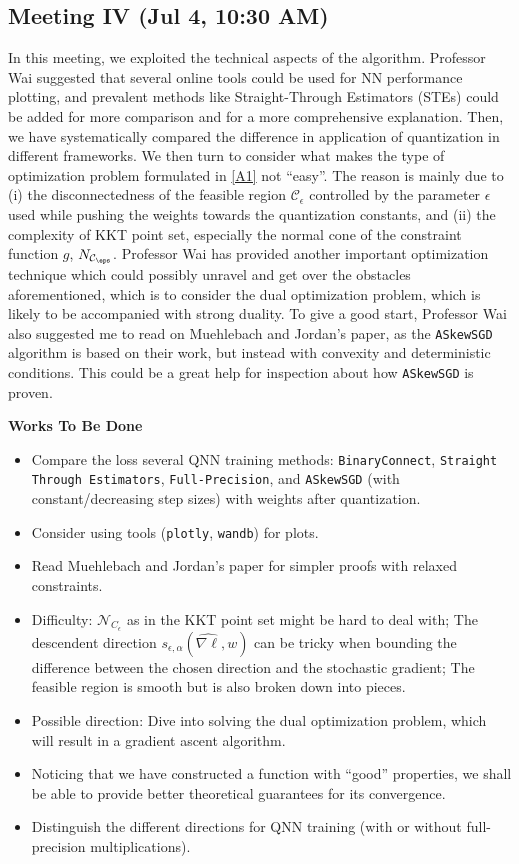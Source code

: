 \documentclass[10pt,a4paper]{article}
\begin{document}
\subsection{Meeting IV (Jul 4, 10:30 AM)}

In this meeting, we exploited the technical aspects of the algorithm. Professor Wai suggested that several online tools could be used for NN performance plotting, and prevalent methods like Straight-Through Estimators (STEs) could be added for more comparison and for a more comprehensive explanation. Then, we have systematically compared the difference in application of quantization in different frameworks. We then turn to consider what makes the type of optimization problem formulated in \ref{A1} not ``easy''. The reason is mainly due to (i) the disconnectedness of the feasible region $\mathcal{C}_{\epsilon}$ controlled by the parameter $\epsilon$ used while pushing the weights towards the quantization constants, and (ii) the complexity of KKT point set, especially the normal cone of the constraint function $g$, $N_{\mathcal{C}_{\eps}}$. Professor Wai has provided another important optimization technique which could possibly unravel and get over the obstacles aforementioned, which is to consider the dual optimization problem, which is likely to be accompanied with strong duality. To give a good start, Professor Wai also suggested me to read on Muehlebach and Jordan's paper, as the \texttt{ASkewSGD} algorithm is based on their work, but instead with convexity and deterministic conditions. This could be a great help for inspection about how \texttt{ASkewSGD} is proven.

\noindent\textbf{Works To Be Done}

\begin{itemize}
     \item Compare the loss several QNN training methods: \texttt{BinaryConnect}, \texttt{Straight Through Estimators}, \texttt{Full-Precision}, and \texttt{ASkewSGD} (with constant/decreasing step sizes) with weights after quantization.
     \item Consider using tools (\texttt{plotly}, \texttt{wandb}) for plots.
     \item Read Muehlebach and Jordan's paper for simpler proofs with relaxed constraints.
     \item Difficulty: $\mathcal{N}_{C_\epsilon}$ as in the KKT point set might be hard to deal with; The descendent direction $s_{\epsilon, \alpha}(\widehat{\nabla \ell}, w)$ can be tricky when bounding the difference between the chosen direction and the stochastic gradient; The feasible region is smooth but is also broken down into pieces.
     \item Possible direction: Dive into solving the dual optimization problem, which will result in a gradient ascent algorithm.
     \item Noticing that we have constructed a function with ``good'' properties, we shall be able to provide better theoretical guarantees for its convergence.
     \item Distinguish the different directions for QNN training (with or without full-precision multiplications).
\end{itemize}
\end{document}
